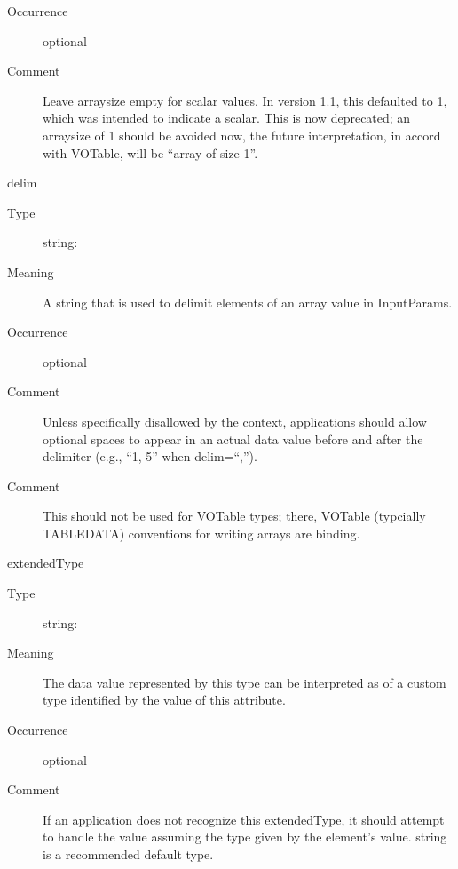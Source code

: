 \documentclass[11pt,a4paper]{ivoa}
\begin{document}
\begin{generated}
\begin{bigdescription}
\begin{description}
\item[Occurrence] optional

\item[Comment] 
                     Leave arraysize empty for scalar values.  In version 1.1,
                     this defaulted to 1, which was intended to indicate
                     a scalar.  This is now deprecated; an arraysize of 1 should
                     be avoided now, the future interpretation, in accord with
                     VOTable, will be “array of size 1”.
                  
\end{description}
\item[delim]
\begin{description}
\item[Type] string: 
\item[Meaning] 
                     A string that is used to delimit elements of an array
                     value in InputParams.
                  
\item[Occurrence] optional
\item[Comment] 
                     Unless specifically disallowed by the context, 
                     applications should allow optional spaces to 
                     appear in an actual data value before and after 
                     the delimiter (e.g., “1, 5” when delim=“,”).
                  
\item[Comment] 
                     This should not be used for VOTable types; there,
                     VOTable (typcially TABLEDATA) conventions for writing
                     arrays are binding.
                  
\end{description}
\item[extendedType]
\begin{description}
\item[Type] string: 
\item[Meaning] 
                     The data value represented by this type can be
                     interpreted as of a custom type identified by 
                     the value of this attribute.
                  
\item[Occurrence] optional
\item[Comment] 
                     If an application does not recognize this
                     extendedType, it should attempt to handle the value
                     assuming the type given by the element's value.
                     string is a recommended default type.
                  

\end{description}
\end{bigdescription}
\end{generated}
\end{document}
